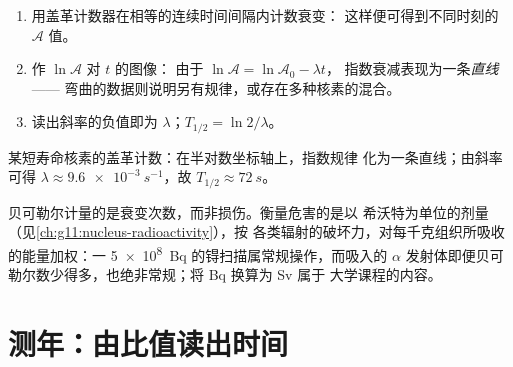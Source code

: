 \begin{method}[测量半衰期]\label{met:g12:radioactive-decay:semilog}
\begin{enumerate}
  \item 用盖革计数器在相等的连续时间间隔内计数衰变：
        这样便可得到不同时刻的 $\mathcal A$ 值。
  \item 作 $\ln \mathcal A$ 对 $t$ 的图像：
        由于 $\ln \mathcal A = \ln \mathcal A_0 - \lambda t$，
        指数衰减表现为一条\emph{直线}——
        弯曲的数据则说明另有规律，或存在多种核素的混合。
  \item 读出斜率的负值即为 $\lambda$；$T_{1/2} = \ln 2/\lambda$。
\end{enumerate}
\end{method}

\begin{omfigure}

{\small 某短寿命核素的盖革计数：在半对数坐标轴上，指数规律
化为一条直线；由斜率可得
$\lambda \approx \qty{9.6e-3}{s^{-1}}$，故 $T_{1/2} \approx \qty{72}{s}$。}
\end{omfigure}

\begin{remark}[贝可勒尔不等于危害]\label{rem:g12:radioactive-decay:dose}
贝可勒尔计量的是衰变次数，而非损伤。衡量危害的是以
希沃特为单位的剂量（见\cref{ch:g11:nucleus-radioactivity}），按
各类辐射的破坏力，对每千克组织所吸收的能量加权：一
\qty{5e8}{Bq} 的锝扫描属常规操作，而吸入的
$\alpha$ 发射体即便贝可勒尔数少得多，也绝非常规；将 \unit{Bq} 换算为 \unit{Sv} 属于
大学课程的内容。
\end{remark}

\section{测年：由比值读出时间}

